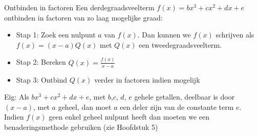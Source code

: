 \documentclass[handout]{beamer}
\newcommand{\ds}{\displaystyle}
\begin{document}
\begin{frame}
{Ontbinden in factoren}
Een derdegraadsveelterm $f(x) = b x^3+ c x^2+ d x+ e$ ontbinden in
factoren van zo laag mogelijke graad: \begin{itemize} \item Stap 1:
Zoek een nulpunt $a$ van $f(x)$. Dan kunnen we $f(x)$ schrijven als
$f(x) = (x-a) Q(x)$ met $Q(x)$ een tweedegraadsveelterm.
\item Stap 2: Bereken $\ds Q(x) = \frac{f(x)}{x-a}$
\item Stap 3: Ontbind $Q(x)$ verder in factoren indien mogelijk
\end{itemize}
Eig:  Als $b x^3+ c x^2+ d x+ e$, met $b$,$c$, $d$, $e$ gehele
getallen, deelbaar is door $(x-a)$, met $a$ geheel, dan moet $a$ een
deler zijn van de constante term $e$. Indien $f(x)$ geen enkel
geheel nulpunt heeft dan moeten we een benaderingsmethode gebruiken
(zie Hoofdstuk 5)
\end{frame}
\end{document}
